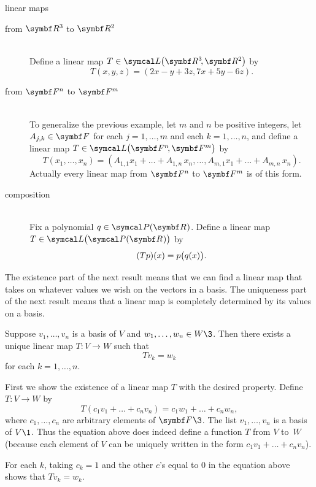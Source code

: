 \begin{example}[2a111]{linear maps}
\begin{description}
\item[from $\R3$ to $\R2$] \ \\
Define a linear map $T\in \L\paren[\big]{\RR{3},\R{2}}$ by
\[
T(x,y,z) = (2x - y + 3z, 7x + 5y -6z).
\]

\item[from $\F{n}$ to $\F{m}$] \ \\
To generalize the previous example, let $m$ and $n$ be positive integers, let
$A_{j,k} \in \F{}$ for each $j = 1, \dots, m$ and each $k = 1, \dots , n$, and define
a linear map $T\in \L\paren[\big]{\FF{n},\F{m}}$ by
\[
T(x_1, \dots, x_n) =
(A_{1,1}x_1 + \dots + A_{1,n} \, x_n, \dots, A_{m,1}x_1 + \dots + A_{m,n}\,x_n).
\]
Actually every linear map from $\F{n}$ to $\F{m}$ is of this form.

\item[composition] \ \\
Fix a polynomial $q \in \P(\R{})$. Define a linear map $T \in \L\paren[\big]{\P(\R{})}$ by
\[
(Tp)(x) = p\paren[\big]{q(x)}.
\]
\end{description}
\exampleitemend
\end{example}

The existence part of the next result means that we can find a linear map that takes on whatever values we wish on the vectors in a basis. The uniqueness part of the next result means that a linear map is completely determined by its values on a basis.

\pagebreak[2]

{Suppose $v_1, \dots, v_n$ is a basis of $V$ and $w_1, \dots, w_n \in W\3$.  Then there exists a unique linear map $T \colon V \to W$ such that
\[
Tv_k = w_k
\]
for each $k = 1, \dots, n$.}

\proof
First we show the existence of a linear map $T$ with the desired property.
Define $T \colon V \to W$ by
\[
T(c_1 v_1 + \dots + c_n v_n) = c_1 w_1 + \dots + c_n w_n,
\]
where $c_1, \dots, c_n$ are arbitrary elements of $\F{}\3$.  The list
$v_1, \dots, v_n$ is a basis of $V\1$. Thus the equation above does indeed define a
function $T$ from $V$ to~$W$ (because each element of $V$ can be uniquely written in the form $c_1 v_1 + \dots + c_n v_n$).

For each $k$, taking $c_k = 1$ and the other $c$'s equal to $0$ in the equation above shows that $Tv_k = w_k$.

